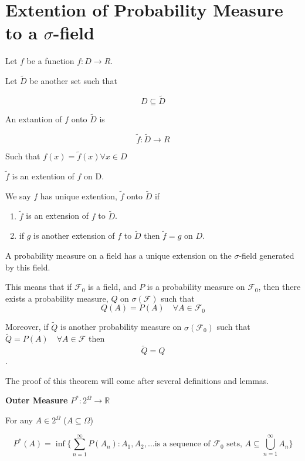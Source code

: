\documentclass[11pt,fleqn]{book} %
\begin{document}
\section{Extention of Probability Measure to a $\sigma$-field}

Let $f$ be a function $f: D\rightarrow R$. 

Let $\tilde{D}$ be another set such that 

$$D \subseteq \tilde{D} $$

An extantion of $f$ onto  $\tilde{D}$ is 

$$\tilde{f}: \tilde{D} \rightarrow R $$

Such that $f(x) = \tilde{f}(x) \forall x \in D$

$\tilde{f}$ is an extention of $f$ on D. 

We say $f$ has unique extention, $\tilde{f}$ onto $\tilde{D}$ if 

\begin{enumerate}
	\item $\tilde{f}$ is an extension of $f$ to $\tilde{D}$.

	\item if $g$ is another extension of $f$ to $\tilde{D}$ then $\tilde{f} = g$ on $D$.
\end{enumerate}


\begin{theorem}
	A probability measure on a field has a unique extension on the $\sigma$-field generated by this field. 

		This means that if $\mathcal{F}_0$ is a field, and $P$ is a probability measure on $\mathcal{F}_0$, then there exists a probability measure, $Q$ on $\sigma(\mathcal{F})$ such that 
		$$Q(A) = P(A)\quad \forall A \in \mathcal{F}_0$$

		Moreover, if $\tilde{Q}$ is another probability measure on $\sigma(\mathcal{F}_0)$ such that $\tilde{Q} = P(A) \quad \forall A \in \mathcal{F}$ then $$\tilde{Q} = Q$$. 
\end{theorem}

	\begin{remark}
		The proof of this theorem will come after several definitions and lemmas. 
	\end{remark}

	\textbf{Outer Measure} $P^*: 2^\Omega \rightarrow \mathbb{R}$  

	For any $A \in 2^\Omega$ ($A \subseteq \Omega$)

	$$P^*(A) = \inf \{\displaystyle \sum_{n=1}^\infty P(A_n): A_1, A_2, \dots \text{is a sequence of } \mathcal{F}_0 \text{ sets, } A \subseteq \bigcup^\infty_{n=1} A_n\} $$
\end{document}
